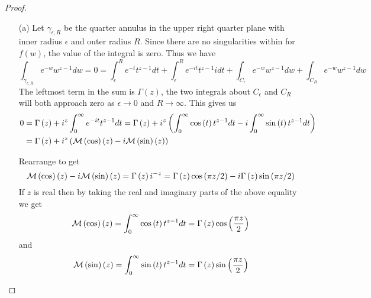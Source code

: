 \documentclass[10pt]{article}
\theoremstyle{plain}
\theoremstyle{remark}
\begin{document}
\begin{proof}
  \begin{enumerate}
  \item[(a)] Let $\gamma_{\epsilon,R}$ be the quarter annulus in the upper right quarter
    plane with inner radius $\epsilon$ and outer radius $R$. Since there are no
    singularities within for $f\left(w\right)$, the value of the integral is zero. Thus we have
    \[
      \int_{\gamma_{\epsilon,R}}e^{-w}w^{z-1}dw = 0 = \int_\epsilon^R e^{-t}t^{z-1}dt + \int_\epsilon^R e^{-it}t^{z-1}idt+\int_{C_\epsilon}e^{-w}w^{z-1}dw+\int_{C_R}e^{-w}w^{z-1}dw
    \]
    The leftmost term in the sum is $\Gamma\left(z\right)$, the two integrals about $C_\epsilon$ and $C_R$
    will both approach zero as $\epsilon\rightarrow 0$ and $R\rightarrow \infty$. This gives us
    \begin{align*}
      0 &= \Gamma\left(z\right)+i^z\int_0^\infty e^{-it}t^{z-1}dt=\Gamma\left(z\right)+i^z\left(\int_0^\infty\cos\left(t\right)t^{z-1}dt-i\int_0^\infty\sin\left(t\right)t^{z-1}dt\right)\\
        &=\Gamma\left(z\right)+i^z\left({\cal M}\left(\cos\right)\left(z\right)-i{\cal M}\left(\sin\right)\left(z\right)\right)
    \end{align*}

    Rearrange to get
    \[
      {\cal M}\left(\cos\right)\left(z\right)-i{\cal M}\left(\sin\right)\left(z\right)= \Gamma\left(z\right)i^{-z}=\Gamma\left(z\right)\cos\left(\pi z/2\right)-i\Gamma\left(z\right)\sin\left(\pi z/2\right)
    \]
    If $z$ is real then by taking the real and imaginary parts of the above
    equality we get
    \[
      {\cal M}\left(\cos\right)\left(z\right)=\int_0^\infty\cos\left(t\right)t^{z-1}dt=\Gamma\left(z\right)\cos\left(\frac{\pi z}{2}\right)
    \]
    and
    \[
      {\cal M}\left(\sin\right)\left(z\right)=\int_0^\infty\sin\left(t\right)t^{z-1}dt=\Gamma\left(z\right)\sin\left(\frac{\pi z}{2}\right)
    \]


\end{enumerate}
\end{proof}
\end{document}
